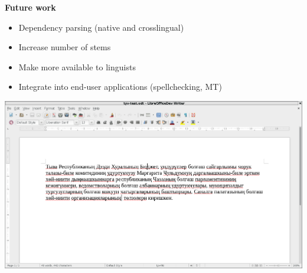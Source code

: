 \documentclass[fontscale=0.35,landscape,paperwidth=841mm,paperheight=1189mm]{baposter}  %
\newcommand{\htwo}[1]{{\htwofont \textbf{\dotfill{}#1\dotfill{}}}}
\begin{document}
\begin{poster}
{				%
			\htwo{Future work}
				\begin{itemize}
					\item Dependency parsing (native and crosslingual)
					\item Increase number of stems
					\item Make more available to linguists
					\item Integrate into end-user applications (spellchecking, MT)
				\end{itemize}
				\vspace{0.3em}
				\includegraphics[width=\textwidth]{img/tyv-spelling-cropped}
				\vspace{-0.1in}
		}


\end{poster}
\end{document}
